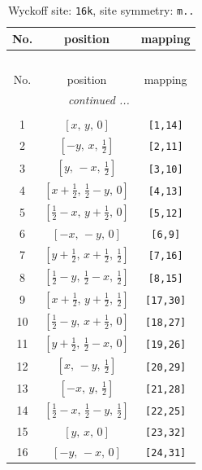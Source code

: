 \documentclass[fleqn,8pt]{jsarticle}
\begin{document}
\renewcommand{\arraystretch}{1.2}
\begin{longtable}{ccc}
\caption{Wyckoff site: {\tt 16k}, site symmetry: {\tt m..}}
 \\
 \hline \hline
No. & position & mapping \\ \hline \endfirsthead

\multicolumn{2}{l}{\tablename\ \thetable{}} \\
 \hline \hline
No. & position & mapping \\ \hline \endhead

 \hline \hline
\multicolumn{2}{r}{\footnotesize\it continued ...} \\ \endfoot

 \hline \hline
\multicolumn{2}{r}{} \\ \endlastfoot

1 & $\left[ x,\, y,\, 0 \right]$ & {\tt [1,14]} \\ \hline
2 & $\left[ - y,\, x,\, \frac{1}{2} \right]$ & {\tt [2,11]} \\ \hline
3 & $\left[ y,\, - x,\, \frac{1}{2} \right]$ & {\tt [3,10]} \\ \hline
4 & $\left[ x + \frac{1}{2},\, \frac{1}{2} - y,\, 0 \right]$ & {\tt [4,13]} \\ \hline
5 & $\left[ \frac{1}{2} - x,\, y + \frac{1}{2},\, 0 \right]$ & {\tt [5,12]} \\ \hline
6 & $\left[ - x,\, - y,\, 0 \right]$ & {\tt [6,9]} \\ \hline
7 & $\left[ y + \frac{1}{2},\, x + \frac{1}{2},\, \frac{1}{2} \right]$ & {\tt [7,16]} \\ \hline
8 & $\left[ \frac{1}{2} - y,\, \frac{1}{2} - x,\, \frac{1}{2} \right]$ & {\tt [8,15]} \\ \hline
9 & $\left[ x + \frac{1}{2},\, y + \frac{1}{2},\, \frac{1}{2} \right]$ & {\tt [17,30]} \\ \hline
10 & $\left[ \frac{1}{2} - y,\, x + \frac{1}{2},\, 0 \right]$ & {\tt [18,27]} \\ \hline
11 & $\left[ y + \frac{1}{2},\, \frac{1}{2} - x,\, 0 \right]$ & {\tt [19,26]} \\ \hline
12 & $\left[ x,\, - y,\, \frac{1}{2} \right]$ & {\tt [20,29]} \\ \hline
13 & $\left[ - x,\, y,\, \frac{1}{2} \right]$ & {\tt [21,28]} \\ \hline
14 & $\left[ \frac{1}{2} - x,\, \frac{1}{2} - y,\, \frac{1}{2} \right]$ & {\tt [22,25]} \\ \hline
15 & $\left[ y,\, x,\, 0 \right]$ & {\tt [23,32]} \\ \hline
16 & $\left[ - y,\, - x,\, 0 \right]$ & {\tt [24,31]} \\
\end{longtable}
\end{document}
